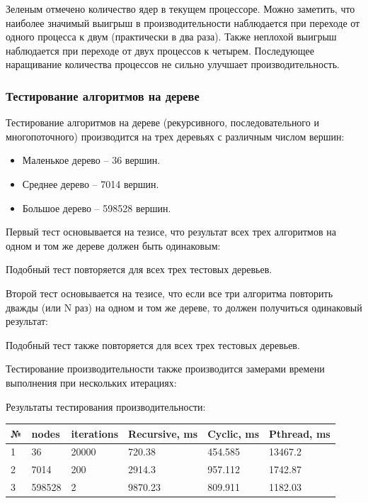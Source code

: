 \documentclass[14pt,a4paper,report]{report}
\begin{document}
Зеленым отмечено количество ядер в текущем процессоре. Можно заметить, что наиболее значимый выигрыш в производительности наблюдается при переходе от одного процесса к двум (практически в два раза). Также неплохой выигрыш наблюдается при переходе от двух процессов к четырем. Последующее наращивание количества процессов не сильно улучшает производительность.

\subsubsection{Тестирование алгоритмов на дереве}

Тестирование алгоритмов на дереве (рекурсивного, последовательного и многопоточного) производится на трех деревьях с различным числом вершин:

\begin{itemize}
	\item Маленькое дерево -- 36 вершин.
	\item Среднее дерево -- 7014 вершин.
	\item Большое дерево -- 598528 вершин.
\end{itemize}

Первый тест основывается на тезисе, что результат всех трех алгоритмов на одном и том же дереве должен быть одинаковым:



Подобный тест повторяется для всех трех тестовых деревьев.

Второй тест основывается на тезисе, что если все три алгоритма повторить дважды (или N раз) на одном и том же дереве, то должен получиться одинаковый результат:



Подобный тест также повторяется для всех трех тестовых деревьев.

Тестирование производительности также производится замерами времени выполнения при нескольких итерациях:



Результаты тестирования производительности:

\begin{table}[h!]
	\centering
	\bgroup
	\def\arraystretch{1}
	\begin{tabular}{ | m{0.8cm} | m{2.0cm} | m{1.8cm} | m{2.8cm} | m{2.6cm} | m{2.6cm} | }
		\hline
		№ & nodes & iterations & Recursive, ms & Cyclic, ms & Pthread, ms \\ \hline
		1 & 36 & 20000 & 720.38 & 454.585 & 13467.2 \\ \hline
		2 & 7014 & 200 & 2914.3 & 957.112 & 1742.87 \\ \hline
		3 & 598528 & 2 & 9870.23 & 809.911 & 1182.03 \\
		\hline
	\end{tabular}
	\egroup
\end{table}
\end{document}
